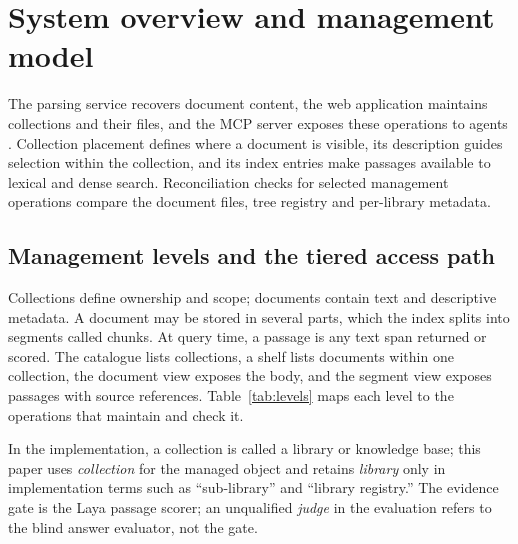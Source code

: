 \section{System overview and management model}
\label{sec:system}

The parsing service recovers document content, the web application
maintains collections and their files, and the MCP server exposes these
operations to agents \cite{mcp}. Collection placement defines where a
document is visible, its description guides selection within the
collection, and
its index entries make passages available to lexical and dense search.
Reconciliation checks for selected management operations compare the
document files, tree registry and per-library metadata.

\subsection{Management levels and the tiered access path}
\label{sec:levels}

Collections define ownership and scope; documents contain text and
descriptive metadata. A document may be stored in several parts, which the
index splits into segments called chunks. At query time, a passage is any
text span returned or scored. The catalogue lists collections, a shelf lists
documents within one collection, the document view exposes the body, and the
segment view exposes passages with source references. Table~\ref{tab:levels}
maps each level to the operations that maintain and check it.

In the implementation, a collection is called a library or knowledge base;
this paper uses \emph{collection} for the managed object and retains
\emph{library} only in implementation terms such as ``sub-library'' and
``library registry.'' The evidence gate is the Laya passage scorer; an
unqualified \emph{judge} in the evaluation refers to the blind answer
evaluator, not the gate.

